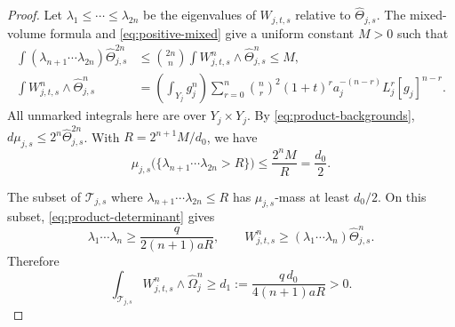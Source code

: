 \documentclass[reqno]{amsart}
\numberwithin{equation}{section}
\theoremstyle{definition}
\begin{document}
\begin{proof}
Let $\lambda_1\le\cdots\le\lambda_{2n}$ be the eigenvalues of
$W_{j,t,s}$ relative to $\widehat\Theta_{j,s}$.
The mixed-volume formula and
\eqref{eq:positive-mixed} give a uniform constant
$M>0$ such that
\begin{equation}\label{eq:large-eigenvalues}
 \begin{aligned}
 \int (\lambda_{n+1}\cdots\lambda_{2n})
                         \widehat\Theta_{j,s}^{2n}
 &\le\binom{2n}{n}\int W_{j,t,s}^n\wedge\widehat\Theta_{j,s}^n
 \le M,\\
 \int W_{j,t,s}^n\wedge\widehat\Theta_{j,s}^n
 &=\left(\int_{Y_j}g_j^n\right)
   \sum_{r=0}^n\binom nr^2(1+t)^r a_j^{-(n-r)}
                  L_j^r[g_j]^{n-r}.
 \end{aligned}
\end{equation}
All unmarked integrals here are over $Y_j\times Y_j$.
By \eqref{eq:product-backgrounds},
$d\mu_{j,s}\le2^n\widehat\Theta_{j,s}^{2n}$.
With $R=2^{n+1}M/d_0$, we have
\[
 \mu_{j,s}\bigl(\{\lambda_{n+1}\cdots\lambda_{2n}>R\}\bigr)
       \le\frac{2^nM}{R}=\frac{d_0}{2}.
\]
\par{}
The subset of $\mathcal T_{j,s}$ where
$\lambda_{n+1}\cdots\lambda_{2n}\le R$ has $\mu_{j,s}$-mass at
least $d_0/2$. On this subset,
\eqref{eq:product-determinant} gives
\[
 \lambda_1\cdots\lambda_n\ge\frac{q}{2(n+1)aR},
 \qquad
 W_{j,t,s}^n\ge(\lambda_1\cdots\lambda_n)\widehat\Theta_{j,s}^n.
\]
Therefore
\begin{equation}\label{eq:diagonal-bound}
 \int_{\mathcal T_{j,s}}W_{j,t,s}^n\wedge\widehat\Omega_j^n
       \ge d_1:=\frac{q\,d_0}{4(n+1)aR}>0.
\end{equation}


\end{proof}
\end{document}

